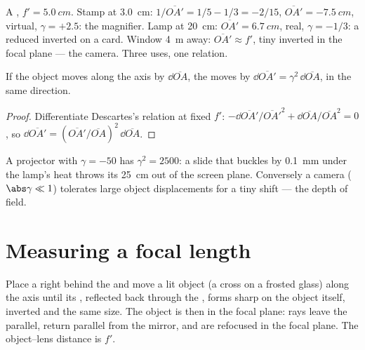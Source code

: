 \begin{example}\label{ex:b1:mirrors-thin-lenses:lensuses}
A , $f' = \qty{5.0}{cm}$. Stamp at \qty{3.0}{cm}:
$1/\overline{OA'} = 1/5 - 1/3 = -2/15$, $\overline{OA'} = \qty{-7.5}{cm}$,
virtual, $\gamma = +2.5$: the magnifier. Lamp at \qty{20}{cm}:
$\overline{OA'} = \qty{6.7}{cm}$, real, $\gamma = -1/3$: a reduced
inverted  on a card. Window \qty{4}{m} away: $\overline{OA'}
\approx f'$, tiny inverted  in the focal plane --- the camera.
Three uses, one relation.
\end{example}

\begin{proposition}\label{prop:b1:mirrors-thin-lenses:longitudinal}
If the object moves along the axis by $\dd\overline{OA}$, the 
moves by $\dd\overline{OA'} = \gamma^2\,\dd\overline{OA}$, in the same
direction.
\end{proposition}

\begin{proof}
Differentiate Descartes's relation at fixed $f'$:
$-\dd\overline{OA'}/\overline{OA'}^2 + \dd\overline{OA}/\overline{OA}^2 = 0$,
so $\dd\overline{OA'} = (\overline{OA'}/\overline{OA})^2\,\dd\overline{OA}$.
\end{proof}

\begin{remark}\label{rem:b1:mirrors-thin-lenses:depth}
A projector with $\gamma = -50$ has $\gamma^2 = 2500$: a slide that
buckles by \qty{0.1}{mm} under the lamp's heat throws its 
\qty{25}{cm} out of the screen plane. Conversely a camera ($\abs\gamma
\ll 1$) tolerates large object displacements for a tiny  shift ---
the depth of field.
\end{remark}

\section{Measuring a focal length}

\begin{method}[Autocollimation]\label{met:b1:mirrors-thin-lenses:autocollimation}
Place a  right behind the  and move a lit object (a
cross on a frosted glass) along the axis until its , reflected
back through the , forms sharp on the object itself, inverted and
the same size. The object is then in the focal plane: rays leave the
 parallel, return parallel from the mirror, and are refocused in
the focal plane. The object--lens distance is $f'$.
\end{method}

